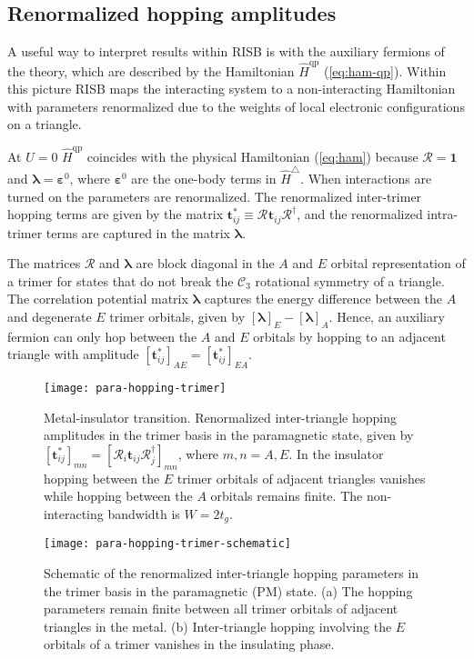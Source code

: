 \documentclass[reprint,aps,prb,amsmath,amssymb]{revtex4-2}
\begin{document}
\subsection{Renormalized hopping amplitudes} \label{sec:renorm-hopping}

A useful way to interpret results within RISB is with the auxiliary fermions of the theory, which are described by the Hamiltonian $\hat{H}^{\mathrm{qp}}$ (\cref{eq:ham-qp}). Within this picture RISB maps the interacting system to a non-interacting Hamiltonian with parameters renormalized due to the weights of local electronic configurations on a triangle. 

At $U=0$ $\hat{H}^{\mathrm{qp}}$ coincides with the physical Hamiltonian (\cref{eq:ham}) because $\bm{\mathcal{R}} = \bm{1}$ and $\bm{\lambda} = \bm{\varepsilon}^0$, where $\bm{\varepsilon}^0$ are the one-body terms in $\hat{H}^{\triangle}$. When interactions are turned on the parameters are renormalized. The renormalized inter-trimer hopping terms are given by the matrix $\bm{t}_{ij}^* \equiv \bm{\mathcal{R}}^{} \bm{t}_{ij} \bm{\mathcal{R}}^{\dagger}$, and the renormalized intra-trimer terms are captured in the matrix $\bm{\lambda}$. 

The matrices $\bm{\mathcal{R}}$ and $\bm{\lambda}$ are block diagonal in the $A$ and $E$ orbital representation of a trimer for states that do not break the $\mathcal{C}_3$ rotational symmetry of a triangle. The correlation potential matrix $\bm{\lambda}$ captures the energy difference between the $A$ and degenerate $E$ trimer orbitals, given by $[\bm{\lambda}]_{E} - [\bm{\lambda}]_{A}$. Hence, an auxiliary fermion can only hop between the $A$ and $E$ orbitals by hopping to an adjacent triangle with amplitude $[\bm{t}_{ij}^*]_{AE} = [\bm{t}_{ij}^*]_{EA}$.

\begin{figure}
	\centering
	\texttt{[image: para-hopping-trimer]}
	\caption{\label{fig:para-hopping-trimer}
		Metal-insulator transition. Renormalized inter-triangle hopping amplitudes in the trimer basis in the paramagnetic state, given by $[\bm{t}_{ij}^*]_{mn} = [\bm{\mathcal{R}}_i^{} \bm{t}_{ij} \bm{\mathcal{R}}_j^{\dagger}]_{mn}$, where $m,n = A,E$. In the insulator hopping between the $E$ trimer orbitals of adjacent triangles vanishes while hopping between the $A$ orbitals remains finite. The non-interacting bandwidth is $W = 2t_g$.
	}
\end{figure}

\begin{figure}
	\centering
	\texttt{[image: para-hopping-trimer-schematic]}
	\caption{\label{fig:para-hopping-schematic}
		Schematic of the renormalized inter-triangle hopping parameters in the trimer basis in the paramagnetic (PM) state. (a) The hopping parameters remain finite between all trimer orbitals of adjacent triangles in the metal. (b) Inter-triangle hopping involving the $E$ orbitals of a trimer vanishes in the insulating phase.
	}
\end{figure}
\end{document}
